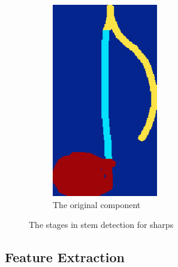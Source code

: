 \begin{figure}[H]
\begin{subfigure}[b]{.2\linewidth}
      \includegraphics[width=\linewidth]{gfx/techniques/stem-detection-4.png}
      \caption{The original component}
      \label{fig:stem-segmentation-4}
  \end{subfigure}

  \caption{The stages in stem detection for sharps}
  \label{fig:bar-line-types}
\end{figure}


\subsection{Feature Extraction}

